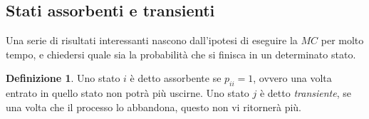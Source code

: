 \documentclass{article}
\theoremstyle{definition}
\newtheorem{definition}[theorem]{Definizione}
\theoremstyle{remark}
\begin{document}
\subsection{Stati assorbenti e transienti}
Una serie di risultati interessanti nascono dall'ipotesi di eseguire la $MC$ per molto tempo, e chiedersi quale sia la probabilità che
si finisca in un determinato stato.
\begin{definition}
    Uno stato $i$ è detto assorbente se $p_{ii} = 1$, ovvero una volta entrato in quello stato non potrà più uscirne. Uno stato $j$ è detto \textit{transiente},
    se una volta che il processo lo abbandona, questo non vi ritornerà più.
\end{definition}

\begin{center}



    \begin{tikzpicture}[x=0.75pt,y=0.75pt,yscale=-1,xscale=1]


\end{tikzpicture}
\end{center}
\end{document}
